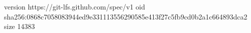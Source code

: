 version https://git-lfs.github.com/spec/v1
oid sha256:0868c7058083944ed9e331113556290585e413f27c5fb9cd0b2a1c664893dca2
size 14383
